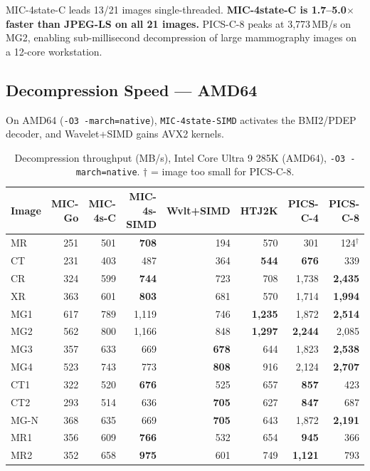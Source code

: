 \documentclass[journal]{IEEEtran}
\begin{document}
MIC-4state-C leads 13/21 images single-threaded. \textbf{MIC-4state-C is
1.7--5.0$\times$ faster than JPEG-LS on all 21 images.} PICS-C-8 peaks at
3,773\,MB/s on MG2, enabling sub-millisecond decompression of large mammography
images on a 12-core workstation.

\subsection{Decompression Speed --- AMD64}

On AMD64 (\texttt{-O3 -march=native}), \texttt{MIC-4state-SIMD} activates the
BMI2/PDEP decoder, and Wavelet+SIMD gains AVX2 kernels.

\begin{table}[t]
\centering
\caption{Decompression throughput (MB/s), Intel Core Ultra 9 285K (AMD64), \texttt{-O3 -march=native}. $\dagger$ = image too small for PICS-C-8.}
\label{tab:decomp-amd64}
\begin{tabular}{lrrrrrrr}
\toprule
Image & MIC-Go & MIC-4s-C & MIC-4s-SIMD & Wvlt+SIMD & HTJ2K & PICS-C-4 & PICS-C-8 \\
\midrule
MR   & 251 & 501 & \textbf{708} & 194 & 570 & 301 & 124$^\dagger$ \\
CT   & 231 & 403 & 487 & 364 & \textbf{544} & \textbf{676} & 339 \\
CR   & 324 & 599 & \textbf{744} & 723 & 708 & 1,738 & \textbf{2,435} \\
XR   & 363 & 601 & \textbf{803} & 681 & 570 & 1,714 & \textbf{1,994} \\
MG1  & 617 & 789 & 1,119 & 746 & \textbf{1,235} & 1,872 & \textbf{2,514} \\
MG2  & 562 & 800 & 1,166 & 848 & \textbf{1,297} & \textbf{2,244} & 2,085 \\
MG3  & 357 & 633 & 669 & \textbf{678} & 644 & 1,823 & \textbf{2,538} \\
MG4  & 523 & 743 & 773 & \textbf{808} & 916 & 2,124 & \textbf{2,707} \\
CT1  & 322 & 520 & \textbf{676} & 525 & 657 & \textbf{857} & 423 \\
CT2  & 293 & 514 & 636 & \textbf{705} & 627 & \textbf{847} & 687 \\
MG-N & 368 & 635 & 669 & \textbf{705} & 643 & 1,872 & \textbf{2,191} \\
MR1  & 356 & 609 & \textbf{766} & 532 & 654 & \textbf{945} & 366 \\
MR2  & 352 & 658 & \textbf{975} & 601 & 749 & \textbf{1,121} & 793 \\

\end{tabular}
\end{table}
\end{document}
